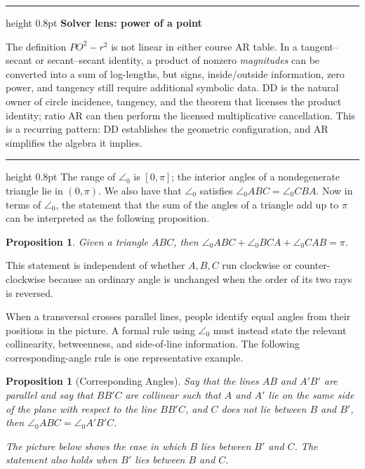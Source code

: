 \documentclass[reqno]{amsart}
\newenvironment{lecturebox}[1]{%
    \par\medskip
    \noindent\begingroup
    \setlength{\parindent}{0pt}
    \color{agblue}\hrule height 0.8pt\color{black}
    \smallskip
    \textbf{\color{agblue}#1}\par\smallskip
}{%
    \smallskip
    \color{agblue}\hrule height 0.8pt\color{black}
    \endgroup
    \medskip
}
\DeclareMathOperator{\1}{\textbf{1}}
\newtheorem{prop}[thm]{Proposition}
\begin{document}
\begin{lecturebox}{Solver lens: power of a point}
The definition $PO^2-r^2$ is not linear in either course AR table. In a
tangent--secant or secant--secant identity, a product of nonzero
\emph{magnitudes} can be converted into a sum of log-lengths, but signs,
inside/outside information, zero power, and tangency still require additional
symbolic data. DD is the natural owner of circle incidence, tangency, and the
theorem that licenses the product identity; ratio AR can then perform the
licensed multiplicative cancellation. This is a recurring pattern: DD
establishes the geometric configuration, and AR simplifies the algebra it
implies.
\end{lecturebox}
The range of $\angle_0$ is $[0,\pi]$; the interior angles of a nondegenerate
triangle lie in $(0,\pi)$. We also have that
$\angle_0$ satisfies $\angle_0ABC = \angle_0CBA$. Now in terms of $\angle_0$,
the statement that the sum of the angles of a triangle add up to $\pi$ can be
interpreted as the following proposition.

\begin{prop}
    Given a triangle $ABC$, then $\angle_0ABC + \angle_0BCA + \angle_0CAB =
    \pi$.
\end{prop}
This statement is independent of whether $A,B,C$ run clockwise or
counter-clockwise because an ordinary angle is unchanged when the order of its
two rays is reversed.

When a transversal crosses parallel lines, people identify equal angles from
their positions in the picture. A formal rule using $\angle_0$ must instead
state the relevant collinearity, betweenness, and side-of-line information.
The following corresponding-angle rule is one representative example.

\begin{prop}[Corresponding Angles]\label{prop: Corresonding Angles for Angle 0}
    Say that the lines $AB$ and $A'B'$ are parallel and say that $BB'C$ are
    collinear such that $A$ and $A'$ lie on the same side of the plane with
    respect to the line $BB'C$, and $C$ does not lie between $B$ and $B'$, then
    $\angle_0ABC = \angle_0A'B'C$.

    \noindent The picture below shows the case in which $B$ lies between $B'$
    and $C$. The statement also holds when $B'$ lies between $B$ and $C$.
\end{prop}
\end{document}
